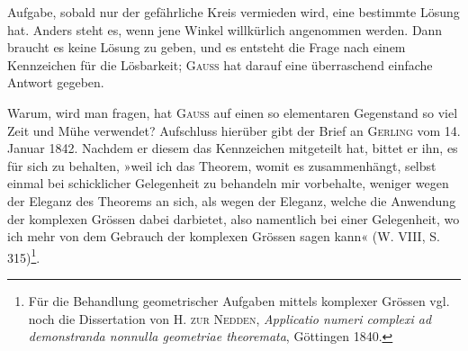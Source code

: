 \clearpage{}\setcounter{footnote}{0}
\noindent Aufgabe, sobald nur der gefährliche Kreis vermieden wird, eine bestimmte
Lösung hat. Anders steht es, wenn jene Winkel willkürlich angenommen
werden. Dann braucht es keine Lösung zu geben, und es entsteht die Frage
nach einem Kennzeichen für die Lösbarkeit; \textsc{Gauss} hat darauf eine überraschend
einfache Antwort gegeben.
\par
Warum, wird man fragen, hat \textsc{Gauss} auf einen so elementaren Gegenstand
so viel Zeit und Mühe verwendet? Aufschluss hierüber gibt der Brief
an \textsc{Gerling} vom 14. Januar 1842. Nachdem er diesem das Kennzeichen mitgeteilt
hat, bittet er ihn, es für sich zu behalten, »weil ich das Theorem,
womit es zusammenhängt, selbst einmal bei schicklicher Gelegenheit zu behandeln
mir vorbehalte, weniger wegen der Eleganz des Theorems an sich,
als wegen der Eleganz, welche die Anwendung der komplexen Grössen dabei
darbietet, also namentlich bei einer Gelegenheit, wo ich mehr von dem Gebrauch
der komplexen Grössen sagen kann« (W. VIII, S. 315)\footnote{Für die Behandlung geometrischer Aufgaben mittels komplexer Grössen vgl. noch die Dissertation von H. \textsc{zur Nedden}, \textit{Applicatio numeri complexi ad demonstranda nonnulla geometriae theoremata}, Göttingen 1840.}.
\clearpage\endgroup
